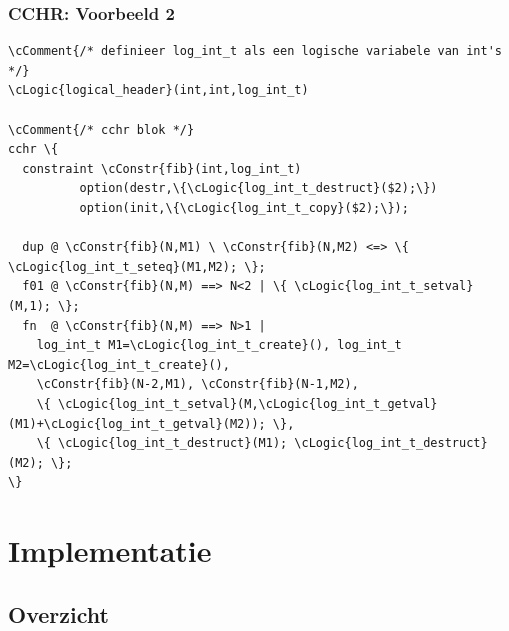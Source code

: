 \documentclass{beamer}
\newcommand{\cConstr}[1]{\textcolor{blue}{#1}}
\newcommand{\cComment}[1]{\textcolor{dgreen}{#1}}
\newcommand{\cLogic}[1]{\textcolor{dbrown}{#1}}
\begin{document}
\begin{frame}[containsverbatim]
  \frametitle{CCHR: Voorbeeld 2}
  \begin{example}[Voorbeeld 2]{\scriptsize
\begin{Verbatim}[commandchars=\\\{\}]
\cComment{/* definieer log_int_t als een logische variabele van int's */}
\cLogic{logical_header}(int,int,log_int_t)

\cComment{/* cchr blok */}
cchr \{
  constraint \cConstr{fib}(int,log_int_t)
          option(destr,\{\cLogic{log_int_t_destruct}($2);\})
          option(init,\{\cLogic{log_int_t_copy}($2);\});

  dup @ \cConstr{fib}(N,M1) \ \cConstr{fib}(N,M2) <=> \{ \cLogic{log_int_t_seteq}(M1,M2); \};
  f01 @ \cConstr{fib}(N,M) ==> N<2 | \{ \cLogic{log_int_t_setval}(M,1); \};
  fn  @ \cConstr{fib}(N,M) ==> N>1 |
    log_int_t M1=\cLogic{log_int_t_create}(), log_int_t M2=\cLogic{log_int_t_create}(),
    \cConstr{fib}(N-2,M1), \cConstr{fib}(N-1,M2),
    \{ \cLogic{log_int_t_setval}(M,\cLogic{log_int_t_getval}(M1)+\cLogic{log_int_t_getval}(M2)); \},
    \{ \cLogic{log_int_t_destruct}(M1); \cLogic{log_int_t_destruct}(M2); \};
\}
\end{Verbatim}
}
  \end{example}
\end{frame}

\section{Implementatie}

\subsection{Overzicht}
\end{document}
